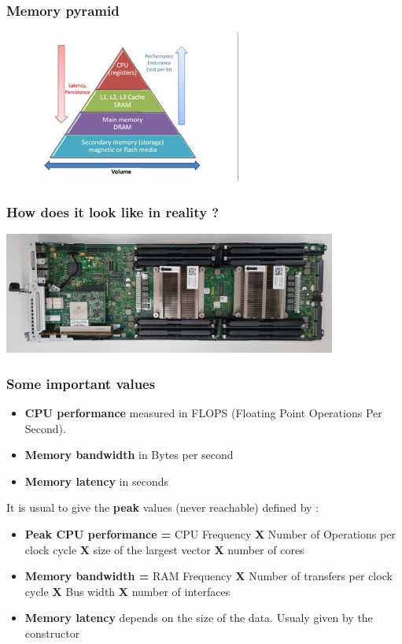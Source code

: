 \begin{frame}[containsverbatim]
\frametitle{Memory pyramid}
\begin{center}
        {\includegraphics[height=5cm]{Day0/images/pyramid.png}}
\end{center}
\end{frame}

\begin{frame}[containsverbatim]
\frametitle{How does it look like in reality ?}
\begin{center}
        {\includegraphics[height=4cm]{Day0/images/bellatrix-node.jpg}}
\end{center}
\end{frame}

\begin{frame}[containsverbatim]
\frametitle{Some important values}
\begin{itemize}
	\item{\textbf{CPU performance} measured in FLOPS (Floating Point Operations Per Second).}
	\item{\textbf{Memory bandwidth} in Bytes per second}
	\item{\textbf{Memory latency} in seconds}
\end{itemize}
It is usual to give the \textbf{peak} values (never reachable) defined by :
\begin{itemize}
	\item{\textbf{Peak CPU performance =} CPU Frequency \textbf{X} Number of Operations per clock cycle \textbf{X} size of the largest vector \textbf{X} number of cores }
	\item{\textbf{Memory bandwidth = } RAM Frequency \textbf{X} Number of transfers per clock cycle \textbf{X} Bus width \textbf{X} number of interfaces }
	\item{\textbf{Memory latency } depends on the size of the data. Usualy given by the constructor}
\end{itemize}
\end{frame}


